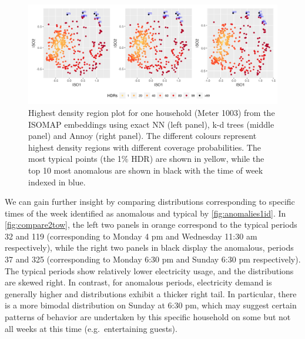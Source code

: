 \documentclass{article}
\begin{document}
\begin{figure}

{\centering \includegraphics[width=1\linewidth]{figures/hdr10_compareisomap_kdtreeannoy_nt50_1id_336tow_200quantile} 

}

\caption{Highest density region plot for one household (Meter 1003) from the ISOMAP embeddings using exact NN (left panel), k-d trees (middle panel) and Annoy (right panel). The different colours represent highest density regions with different coverage probabilities. The most typical points (the 1\% HDR) are shown in yellow, while the top 10 most anomalous are shown in black with the time of week indexed in blue.}\label{fig:anomalies1id}
\end{figure}

We can gain further insight by comparing distributions corresponding to
specific times of the week identified as anomalous and typical by
\autoref{fig:anomalies1id}. In \autoref{fig:compare2tow}, the left two
panels in orange correspond to the typical periods 32 and 119
(corresponding to Monday 4 pm and Wednesday 11:30 am respectively),
while the right two panels in black display the anomalous, periods 37
and 325 (corresponding to Monday 6:30 pm and Sunday 6:30 pm
respectively). The typical periods show relatively lower electricity
usage, and the distributions are skewed right. In contrast, for
anomalous periods, electricity demand is generally higher and
distributions exhibit a thicker right tail. In particular, there is a
more bimodal distribution on Sunday at 6:30 pm, which may suggest
certain patterns of behavior are undertaken by this specific household
on some but not all weeks at this time (e.g.~entertaining guests).
\end{document}
